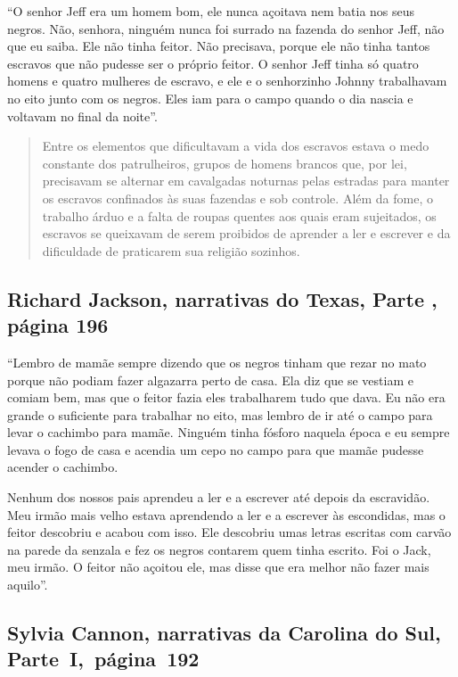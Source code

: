 ``O senhor Jeff era um homem bom, ele nunca açoitava nem batia nos seus
negros. Não, senhora, ninguém nunca foi surrado na fazenda do senhor
Jeff, não que eu saiba. Ele não tinha feitor. Não precisava, porque ele
não tinha tantos escravos que não pudesse ser o próprio feitor. O senhor
Jeff tinha só quatro homens e quatro mulheres de escravo, e ele e o
senhorzinho Johnny trabalhavam no eito junto com os negros. Eles iam para
o campo quando o dia nascia e voltavam no final da noite''.

\begin{quote}
Entre os elementos que dificultavam a vida dos escravos estava o
medo constante dos patrulheiros, grupos de homens brancos que, por lei,
precisavam se alternar em cavalgadas noturnas pelas estradas para manter
os escravos confinados às suas fazendas e sob controle. Além da fome, o
trabalho árduo e a falta de roupas quentes aos quais eram sujeitados, os
escravos se queixavam de serem proibidos de aprender a ler e escrever e
da dificuldade de praticarem sua religião sozinhos.
\end{quote}

\subsection{Richard Jackson, narrativas do Texas, Parte , página 196}
\label{ref162}

``Lembro de mamãe sempre dizendo que os negros tinham que rezar no mato
porque não podiam fazer algazarra perto de casa. Ela diz que se vestiam
e comiam bem, mas que o feitor fazia eles trabalharem tudo que dava. Eu
não era grande o suficiente para trabalhar no eito, mas lembro de ir até
o campo para levar o cachimbo para mamãe. Ninguém tinha fósforo naquela
época e eu sempre levava o fogo de casa e acendia um cepo no campo para
que mamãe pudesse acender o cachimbo.

Nenhum dos nossos pais aprendeu a ler e a escrever até depois da
escravidão. Meu irmão mais velho estava aprendendo a ler e a escrever às
escondidas, mas o feitor descobriu e acabou com isso. Ele descobriu umas
letras escritas com carvão na parede da senzala e fez os negros contarem
quem tinha escrito. Foi o Jack, meu irmão. O feitor não açoitou ele, mas
disse que era melhor não fazer mais aquilo''.

\subsection{Sylvia Cannon, narrativas da Carolina do Sul, Parte~I,~página~192} \label{ref45}

